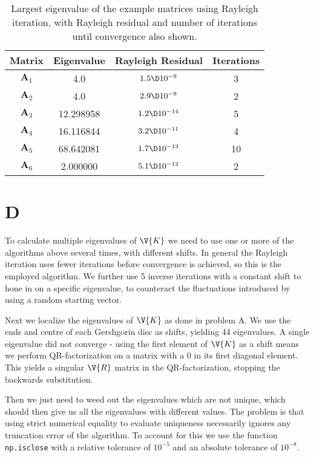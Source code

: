 \documentclass[a4paper,10pt]{article}
\begin{document}
	\begin{table}[H]
		\centering
		\begin{tabular}{c|c|c|c}
			Matrix & Eigenvalue & Rayleigh Residual & Iterations \\
			\hline
			$ \textbf{A}_1 $ & 4.0 & $ 1.5 \D 10^{-9} $ & 3 \\
			$ \textbf{A}_2 $ & 4.0 & $ 2.9 \D 10^{-9} $ & 2 \\
			$ \textbf{A}_3 $ & 12.298958 & $ 1.2 \D 10^{-14} $ & 5 \\
			$ \textbf{A}_4 $ & 16.116844 & $ 3.2 \D 10^{-11} $ & 4 \\
			$ \textbf{A}_5 $ & 68.642081 & $ 1.7 \D 10^{-13} $ & 10 \\
			$ \textbf{A}_6 $ &  2.000000 & $ 5.1 \D 10^{-12} $ & 2
		\end{tabular}
		\caption{Largest eigenvalue of the example matrices using Rayleigh iteration, with Rayleigh residual and number of iterations until convergence also shown.}
		\label{tab:rayleigh_iter}
	\end{table}
	
	
	\section*{D}
	To calculate multiple eigenvalues of $ \V{K} $ we need to use one or more of the algorithms above several times, with different shifts. In general the Rayleigh iteration uses fewer iterations before convergence is achieved, so this is the employed algorithm. We further use 5 inverse iterations with a constant shift to hone in on a specific eigenvalue, to counteract the fluctuations introduced by using a random starting vector.
	
	Next we localize the eigenvalues of $ \V{K} $ as done in problem A. We use the ends and centre of each Gershgorin disc as shifts, yielding 44 eigenvalues. A single eigenvalue did not converge - using the first element of $ \V{K} $ as a shift means we perform QR-factorization on a matrix with a 0 in its first diagonal element. This yields a singular $ \V{R} $ matrix in the QR-factorization, stopping the backwards substitution.
	
	Then we just need to weed out the eigenvalues which are not unique, which should then give us all the eigenvalues with different values. The problem is that using strict numerical equality to evaluate uniqueness necessarily ignores any truncation error of the algorithm. To account for this we use the function \texttt{np.isclose} with a relative tolerance of $ 10^{-5} $ and an absolute tolerance of $ 10^{-8} $.
	
\end{document}
